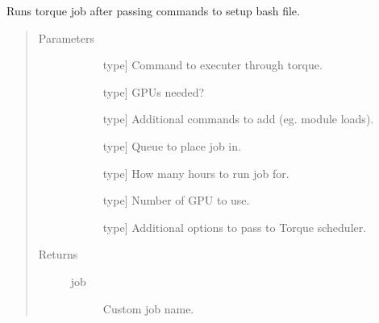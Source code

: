 \documentclass[letterpaper,10pt,english]{sphinxmanual}
\begin{document}
\begin{fulllineitems}
\label{\detokenize{index:methylnet.torque_jobs.assemble_run_torque}}
Runs torque job after passing commands to setup bash file.
\begin{quote}\begin{description}
\item[{Parameters}] \leavevmode\begin{description}
\item[{}] \leavevmode{[}type{]}
Command to executer through torque.

\item[{}] \leavevmode{[}type{]}
GPUs needed?

\item[{}] \leavevmode{[}type{]}
Additional commands to add (eg. module loads).

\item[{}] \leavevmode{[}type{]}
Queue to place job in.

\item[{}] \leavevmode{[}type{]}
How many hours to run job for.

\item[{}] \leavevmode{[}type{]}
Number of GPU to use.

\item[{}] \leavevmode{[}type{]}
Additional options to pass to Torque scheduler.

\end{description}

\item[{Returns}] \leavevmode\begin{description}
\item[{job}] \leavevmode
Custom job name.

\end{description}

\end{description}\end{quote}

\end{fulllineitems}
\end{document}
